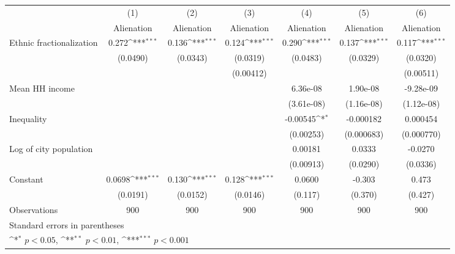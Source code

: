 {
\def\sym#1{\ifmmode^{#1}\else\(^{#1}\)\fi}
\begin{tabular}{l*{6}{c}}
\hline\hline
                    &\multicolumn{1}{c}{(1)}&\multicolumn{1}{c}{(2)}&\multicolumn{1}{c}{(3)}&\multicolumn{1}{c}{(4)}&\multicolumn{1}{c}{(5)}&\multicolumn{1}{c}{(6)}\\
                    &\multicolumn{1}{c}{Alienation}&\multicolumn{1}{c}{Alienation}&\multicolumn{1}{c}{Alienation}&\multicolumn{1}{c}{Alienation}&\multicolumn{1}{c}{Alienation}&\multicolumn{1}{c}{Alienation}\\
\hline
Ethnic fractionalization&       0.272\sym{***}&       0.136\sym{***}&       0.124\sym{***}&       0.290\sym{***}&       0.137\sym{***}&       0.117\sym{***}\\
                    &    (0.0490)         &    (0.0343)         &    (0.0319)         &    (0.0483)         &    (0.0329)         &    (0.0320)         \\
                    &                     &                     &   (0.00412)         &                     &                     &   (0.00511)         \\
[1em]
Mean HH income      &                     &                     &                     &    6.36e-08         &    1.90e-08         &   -9.28e-09         \\
                    &                     &                     &                     &  (3.61e-08)         &  (1.16e-08)         &  (1.12e-08)         \\
[1em]
Inequality          &                     &                     &                     &    -0.00545\sym{*}  &   -0.000182         &    0.000454         \\
                    &                     &                     &                     &   (0.00253)         &  (0.000683)         &  (0.000770)         \\
[1em]
Log of city population&                     &                     &                     &     0.00181         &      0.0333         &     -0.0270         \\
                    &                     &                     &                     &   (0.00913)         &    (0.0290)         &    (0.0336)         \\
[1em]
Constant            &      0.0698\sym{***}&       0.130\sym{***}&       0.128\sym{***}&      0.0600         &      -0.303         &       0.473         \\
                    &    (0.0191)         &    (0.0152)         &    (0.0146)         &     (0.117)         &     (0.370)         &     (0.427)         \\
\hline
Observations        &         900         &         900         &         900         &         900         &         900         &         900         \\
\hline\hline
\multicolumn{7}{l}{\footnotesize Standard errors in parentheses}\\
\multicolumn{7}{l}{\footnotesize \sym{*} \(p<0.05\), \sym{**} \(p<0.01\), \sym{***} \(p<0.001\)}\\
\end{tabular}
}
